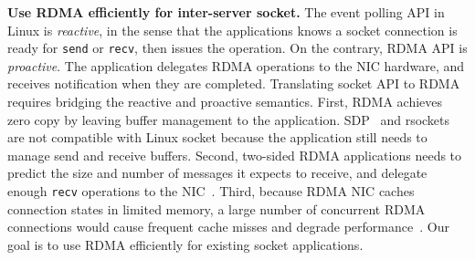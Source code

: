 \textbf{Use RDMA efficiently for inter-server socket.}
The event polling API in Linux is \textit{reactive}, in the sense that the applications knows a socket connection is ready for \texttt{send} or \texttt{recv}, then issues the operation.
On the contrary, RDMA API is \textit{proactive}. The application delegates RDMA operations to the NIC hardware, and receives notification when they are completed.
Translating socket API to RDMA requires bridging the reactive and proactive semantics.
First, RDMA achieves zero copy by leaving buffer management to the application. SDP~\cite{socketsdirect} and rsockets~\cite{rsockets} are not compatible with Linux socket because the application still needs to manage send and receive buffers.
Second, two-sided RDMA applications needs to predict the size and number of messages it expects to receive, and delegate enough \texttt{recv} operations to the NIC~\cite{huang2017high}.
Third, because RDMA NIC caches connection states in limited memory, a large number of concurrent RDMA connections would cause frequent cache misses and degrade performance~\cite{mprdma,kaminsky2016design}.
Our goal is to use RDMA efficiently for existing socket applications.
